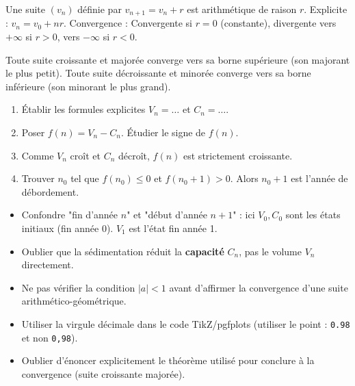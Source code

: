 \documentclass[11pt]{article}
\begin{document}
\begin{propriete}
Une suite $(v_n)$ définie par $v_{n+1} = v_n + r$ est arithmétique de raison $r$.
Explicite : $v_n = v_0 + nr$.
Convergence : Convergente si $r=0$ (constante), divergente vers $+\infty$ si $r>0$, vers $-\infty$ si $r<0$.
\end{propriete}

\begin{propriete}
Toute suite croissante et majorée converge vers sa borne supérieure (son majorant le plus petit).
Toute suite décroissante et minorée converge vers sa borne inférieure (son minorant le plus grand).
\end{propriete}

\begin{methode}
\begin{enumerate}
    \item Établir les formules explicites $V_n = \dots$ et $C_n = \dots$.
    \item Poser $f(n) = V_n - C_n$. Étudier le signe de $f(n)$.
    \item Comme $V_n$ croît et $C_n$ décroît, $f(n)$ est strictement croissante.
    \item Trouver $n_0$ tel que $f(n_0) \le 0$ et $f(n_0+1) > 0$. Alors $n_0+1$ est l'année de débordement.
\end{enumerate}
\end{methode}

\begin{attention}
\begin{itemize}
    \item Confondre "fin d'année $n$" et "début d'année $n+1$" : ici $V_0, C_0$ sont les états initiaux (fin année 0). $V_1$ est l'état fin année 1.
    \item Oublier que la sédimentation réduit la \textbf{capacité} $C_n$, pas le volume $V_n$ directement.
    \item Ne pas vérifier la condition $|a|<1$ avant d'affirmer la convergence d'une suite arithmético-géométrique.
    \item Utiliser la virgule décimale dans le code TikZ/pgfplots (utiliser le point : \texttt{0.98} et non \texttt{0,98}).
    \item Oublier d'énoncer explicitement le théorème utilisé pour conclure à la convergence (suite croissante majorée).
\end{itemize}
\end{attention}
\end{document}
